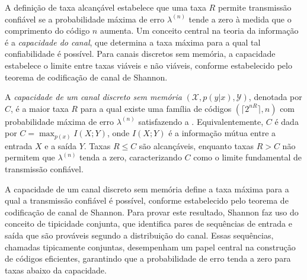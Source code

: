 A definição de taxa alcançável estabelece que uma taxa $R$ permite transmissão
confiável se a probabilidade máxima de erro $\lambda^{(n)}$ tende a zero à
medida que o comprimento do código $n$ aumenta. Um conceito central na teoria
da informação é a \emph{capacidade do canal}, que determina a taxa máxima para
a qual tal confiabilidade é possível. Para canais discretos sem memória, a
capacidade estabelece o limite entre taxas viáveis e não viáveis, conforme
estabelecido pelo teorema de codificação de canal de Shannon.



\begin{definition}
A \emph{capacidade de um canal discreto sem memória} $(\mathcal{X}, p(y|x), \mathcal{Y})$, 
denotada por $C$, é a maior taxa $R$ para a qual existe uma família de códigos $(\lceil 2^{nR} \rceil, n)$ 
com probabilidade máxima de erro $\lambda^{(n)}$ satisfazendo a .
Equivalentemente, $C$ é dada por $C = \max_{p(x)} I(X;Y)$,
onde $I(X;Y)$ é a informação mútua entre a entrada $X$ e a saída $Y$. 
Taxas $R \leq C$ são alcançáveis, enquanto taxas $R > C$ não permitem que $\lambda^{(n)}$ tenda a zero, caracterizando $C$ como o limite fundamental de transmissão confiável.
\end{definition}


A capacidade de um canal discreto sem memória define a taxa máxima para a qual
a transmissão confiável é possível, conforme estabelecido pelo teorema de
codificação de canal de Shannon. Para provar este resultado, Shannon faz uso
do conceito de tipicidade conjunta, que identifica pares de
sequências de entrada e saída que são prováveis segundo a distribuição do
canal. Essas sequências, chamadas tipicamente conjuntas, desempenham um papel
central na construção de códigos eficientes, garantindo que a probabilidade de
erro tenda a zero para taxas abaixo da capacidade. 

